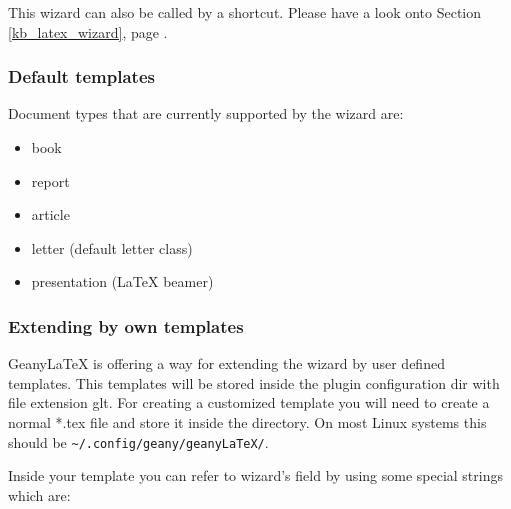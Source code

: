 \documentclass[%
paper=a4,%
fontsize=11pt,%
twoside=false,%
DIV18,%
headsepline,%
plainheadsepline,%
footsepline,%
plainfootsepline,%
bibliography=totoc,%
listof=totoc,%
BCOR10mm,%
parskip=half,%
openany,%
]{scrartcl}
\begin{document}
This wizard can also be called by a shortcut. Please have a look onto
Section \ref{kb_latex_wizard}, page \pageref{kb_latex_wizard}.

\subsubsection{Default templates}
Document types that are currently supported by the wizard are:
\begin{itemize}
	\item book
	\item report
	\item article
	\item letter (default letter class)
	\item presentation (\LaTeX{} beamer)
\end{itemize}

\subsubsection{Extending by own templates}
\label{sec:extending_wizard_by_own_templates}
Geany\LaTeX{} is offering a way for extending the wizard by user
defined templates. This templates will be stored inside the plugin
configuration dir with file extension glt. For creating a
customized template you will need to create a normal *.tex file and
store it inside the directory. On most Linux systems this should be
\texttt{\textasciitilde/.config/geany/geanyLaTeX/}.

Inside your template you can refer to wizard's field by using some
special strings which are:
\end{document}
